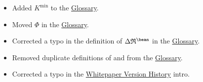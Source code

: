 \documentclass[class=article, crop=false]{standalone}
\begin{document}
\begin{itemize}[topsep=0pt, itemsep=3pt,leftmargin=16pt]
\begin{itemize}
        \item Added $K^{\text{min}}$ to the \hyperlink{subsection.14.11}{Glossary}.
        \item Moved $\Phi$ in the \hyperlink{subsection.14.11}{Glossary}.
        \item Corrected a typo in the definition of $\Delta \mathfrak{R}^{\bean}$ in the \hyperlink{subsection.14.11}{Glossary}.
        \item Removed duplicate definitions of  and  from the \hyperlink{subsection.14.11}{Glossary}.
        \item Corrected a typo in the \hyperlink{subsection.14.12}{Whitepaper Version History} intro.
    \end{itemize}  
\end{itemize}
\end{document}
